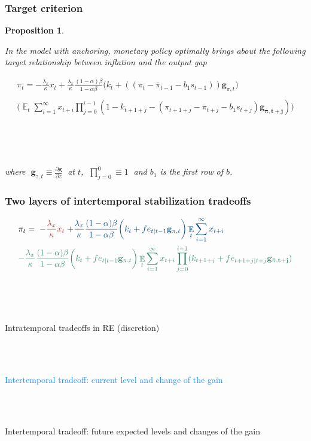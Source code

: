 \documentclass[10pt]{beamer}
\DeclareMathOperator{\E}{\mathbb{E}}
\newtheorem{prop}{Proposition}
\begin{document}
\begin{frame}
	\frametitle{Target criterion}
	\label{anchTC}
	
	\begin{prop} 

\

In the model with anchoring, monetary policy optimally brings about the following target relationship between inflation and the output gap
	
\begin{align*}
\pi_t  = -\frac{\lambda_x}{\kappa}x_t + \frac{\lambda_x}{\kappa}\frac{(1-\alpha)\beta}{1-\alpha\beta} \bigg(k_t+((\pi_t - \bar{\pi}_{t-1}-b_1 s_{t-1}))\mathbf{g}_{\pi,t}\bigg) \\
\\
\bigg(\E_t\sum_{i=1}^{\infty}x_{t+i}\prod_{j=0}^{i-1}(1-k_{t+1+j} - (\pi_{t+1+j} - \bar{\pi}_{t+j}-b_1 s_{t+j})\mathbf{g_{\bar{\pi}, t+j}}) \bigg)
 \label{target}
\end{align*}

\

\

where $\; \mathbf{g}_{z,t} \equiv \frac{\partial \mathbf{g}}{\partial z}\;$ at $t$, $\; \prod_{j=0}^{0} \equiv 1 \; $ and $b_1$ is the first row of $b$.
	\end{prop}

\vspace{-0.1cm}

\hfill \hyperlink{generalTC}{}

\end{frame}

\begin{frame}
	\frametitle{Two layers of intertemporal stabilization tradeoffs}
\small{
\begin{align*}
& \pi_t  =  \; \textcolor{brownreddark}{-\frac{\lambda_x}{\kappa} x_t} \textcolor{dodgerblue}{ \; + \frac{\lambda_x}{\kappa} \frac{(1-\alpha)\beta}{1-\alpha\beta} \bigg(k_t+ fe_{t|t-1}\mathbf{g}_{\pi,t} \bigg)\E_t\sum_{i=1}^{\infty}x_{t+i}}  \\
& \textcolor{aquamarinegreen}{- \frac{\lambda_x}{\kappa} \frac{(1-\alpha)\beta}{1-\alpha\beta} \bigg(k_t+ fe_{t|t-1}\mathbf{g}_{\pi,t} \bigg)\E_t\sum_{i=1}^{\infty}x_{t+i}\prod_{j=0}^{i-1}(k_{t+1+j}+ fe_{t+1+j|t+j}\mathbf{g_{\bar{\pi},t+j}} )}
\end{align*}

\

\

\textcolor{brownreddark}{Intratemporal tradeoffs in RE (discretion)} \\

\

\

\textcolor{dodgerblue}{Intertemporal tradeoff: current level and change of the gain } \\

\

\

\textcolor{aquamarinegreen}{Intertemporal tradeoff: future expected levels and changes of the gain}

}
\end{frame}
\end{document}
